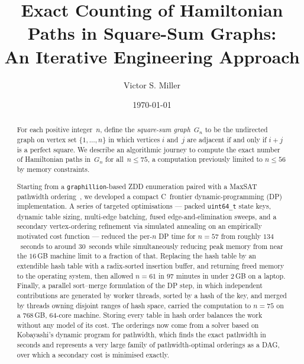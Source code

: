 \documentclass[12pt]{article}
\theoremstyle{definition}
\newcommand{\Gn}{G_n}
\begin{document}
\title{\textbf{Exact Counting of Hamiltonian Paths in Square-Sum Graphs:\\
An Iterative Engineering Approach}}

\author{Victor S. Miller}

\date{\today}

\maketitle

\begin{abstract}
For each positive integer~$n$, define the \emph{square-sum graph}~$\Gn$ to be
the undirected graph on vertex set $\{1,\ldots,n\}$ in which vertices $i$ and~$j$
are adjacent if and only if $i+j$ is a perfect square.
We describe an algorithmic journey to compute the exact number of Hamiltonian
paths in~$\Gn$ for all~$n \le 75$,
a computation previously limited to $n \le 56$ by memory constraints.

Starting from a \texttt{graphillion}-based ZDD enumeration paired with a
MaxSAT pathwidth ordering~\cite{Coudert}, we developed a compact
C~frontier dynamic-programming (DP) implementation.
A series of targeted optimisations — packed \texttt{uint64\_t} state
keys, dynamic table sizing, multi-edge batching, fused edge-and-elimination
sweeps, and a secondary vertex-ordering refinement via simulated annealing
on an empirically motivated cost function — reduced the per-$n$ DP time for
$n = 57$ from roughly $134$~seconds to around $30$~seconds while
simultaneously reducing peak memory from near the $16$\,GB machine limit
to a fraction of that.
Replacing the hash table by an extendible hash table with a radix-sorted
insertion buffer, and returning freed memory to the operating system, then
allowed $n=61$ in $97$ minutes in under $2$\,GB on a laptop.
Finally, a parallel sort--merge formulation of the DP step, in which
independent contributions are generated by worker threads, sorted by a hash
of the key, and merged by threads owning disjoint ranges of hash space,
carried the computation to $n=75$ on a $768$\,GB, $64$-core machine.
Storing every table in hash order balances the work without any model of
its cost.
The orderings now come from a solver based on Kobayashi's dynamic program for
pathwidth, which finds the exact pathwidth in seconds and represents a very
large family of pathwidth-optimal orderings as a DAG, over which a secondary
cost is minimised exactly.
\end{abstract}
\end{document}

